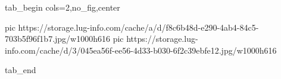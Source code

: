  
 
 
 
 


\ifcmt
  tab_begin cols=2,no_fig,center

     pic https://storage.lug-info.com/cache/a/d/f8c6b48d-e290-4ab4-84c5-703b5f96f1b7.jpg/w1000h616%
		 pic https://storage.lug-info.com/cache/d/3/045ea56f-ee56-4d33-b030-6f2c39ebfe12.jpg/w1000h616%

  tab_end
\fi
